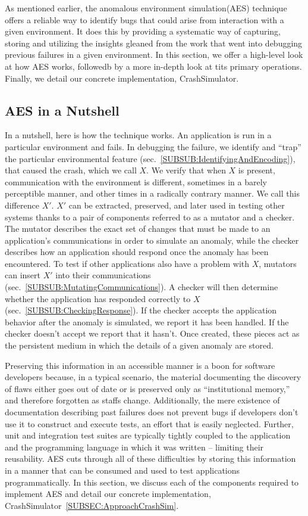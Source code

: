 As mentioned earlier,
the anomalous environment simulation(AES) technique
offers a reliable way to identify bugs that could arise from interaction
with a given environment.
It does this by providing a systematic way of
capturing, storing and utilizing the insights gleaned from the work that
went into debugging previous failures in a given environment.
In this section, we offer a high-level look at how AES works, followedb by
a more in-depth look at tits primary operations.
Finally, we detail our concrete implementation, CrashSimulator.

\subsection{AES in a Nutshell}
\label{SEC:AESNutshell}
In a nutshell,
here is how the technique works.
An application is run
in a particular environment and fails.
In debugging the failure,
we identify and ``trap'' the particular environmental feature
(sec.~\ref{SUBSUB:IdentifyingAndEncoding}),
that caused the crash,  which we call $X$.
We verify that when $X$ is present,
communication with the
environment is different,
sometimes in a barely perceptible manner,
and other times in a radically contrary manner.
We call this difference $X'$.
$X'$ can be extracted, preserved,
and later used in testing other systems
thanks to a pair of components referred to as a mutator and a checker.
The mutator describes the exact set of changes
that must be made to an application's communications
in order to simulate an anomaly,
while the checker describes how an
application should respond once the anomaly has been encountered.
To test if other applications also have a problem with $X$,
mutators can insert $X'$ into their
communications (sec.~\ref{SUBSUB:MutatingCommunications}).
A checker will then determine whether the
application has responded correctly to
$X$(sec.~\ref{SUBSUB:CheckingResponse}).
If the checker accepts the application behavior
after the anomaly is simulated,
we report it has been handled.
If the checker doesn't accept we report that it hasn't.
Once created,
these pieces act as the persistent medium in which the details of
a given anomaly are stored.

Preserving this information in an accessible manner
is a boon for software developers because,
in a typical scenario, the material documenting
the discovery of flaws
either goes out of date or
is preserved only as ``institutional memory,''
and therefore forgotten as staffs change.
Additionally,
the mere existence of documentation
describing past failures
does not prevent bugs
if developers don't use it
to construct and execute tests,
an effort that is easily neglected.
Further, unit and integration test suites
are typically tightly coupled
to the application and the programming language in which it was written --
limiting their reusability.
AES cuts through all of these difficulties by
storing this information in a manner that can be consumed
and used to test applications programmatically.
In this section, we discuss each of the components
required to implement AES
and detail our concrete implementation,
CrashSimulator~\ref{SUBSEC:ApproachCrashSim}.

